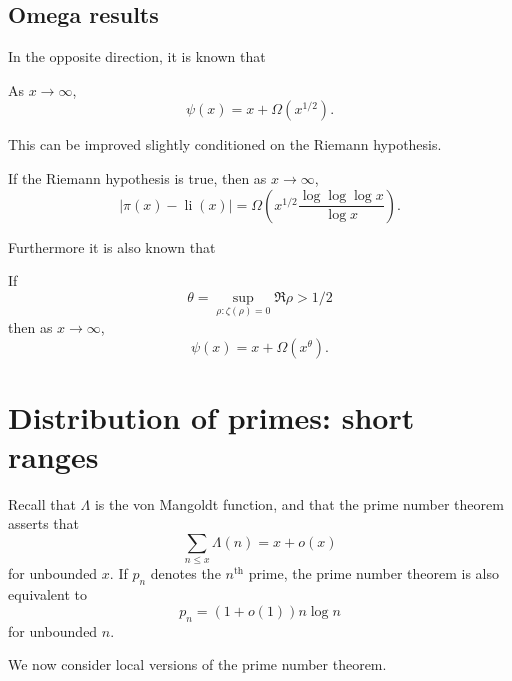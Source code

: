 \section{Omega results}

In the opposite direction, it is known that
\begin{theorem}
As $x \to \infty$,
\[
\psi(x) = x + \Omega(x^{1/2}).
\]
\end{theorem}
This can be improved slightly conditioned on the Riemann hypothesis.
\begin{theorem}
If the Riemann hypothesis is true, then as $x \to \infty$,
\[
|\pi(x) - \operatorname{li}(x)| = \Omega\left(x^{1/2}\frac{\log\log\log x}{\log x}\right).
\]
\end{theorem}

Furthermore it is also known that
\begin{theorem}
If
\[
\theta = \sup_{\rho: \zeta(\rho) = 0}\Re \rho > 1/2
\]
then as $x \to \infty$,
\[
\psi(x) = x + \Omega(x^{\theta}).
\]
\end{theorem}


\chapter{Distribution of primes: short ranges}\label{primes-sec}

Recall that $\Lambda$ is the von Mangoldt function, and that the prime number theorem asserts that
$$ \sum_{n \leq x} \Lambda(n) = x + o(x)$$
for unbounded $x$.  If $p_n$ denotes the $n^{\mathrm{th}}$ prime, the prime number theorem is also equivalent to
$$ p_n = (1+o(1)) n \log n$$
for unbounded $n$.

We now consider local versions of the prime number theorem.

